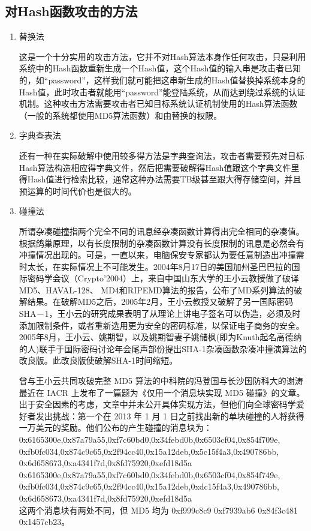 \subsection{对Hash函数攻击的方法}
\begin{enumerate}
\item 替换法

这是一个十分实用的攻击方法，它并不对Hash算法本身作任何攻击，只是利用系统中的Hash函数重新生成一个Hash值，这个Hash值的输入串是攻击者已知的，如“password”，这样我们就可能把这串新生成的Hash值替换掉系统本身的Hash值，此时攻击者就能用“password”能登陆系统，从而达到绕过系统的认证机制。这种攻击方法需要攻击者已知目标系统认证机制使用的Hash算法函数（一般的系统都使用MD5算法函数）和由替换的权限。
\item 字典查表法

还有一种在实际破解中使用较多得方法是字典查询法，攻击者需要预先对目标Hash算法构造相应得字典文件，然后把需要破解得Hash值跟这个字典文件里得Hash值进行检索比较，通常这种办法需要TB级甚至跟大得存储空间，并且预运算的时间代价也是很大的。
\item 碰撞法

所谓杂凑碰撞指两个完全不同的讯息经杂凑函数计算得出完全相同的杂凑值。根据鸽巢原理，以有长度限制的杂凑函数计算没有长度限制的讯息是必然会有冲撞情况出现的。可是，一直以来，电脑保安专家都认为要任意制造出冲撞需时太长，在实际情况上不可能发生。2004年8月17日的美国加州圣巴巴拉的国际密码学会议（Crypto’2004）上，来自中国山东大学的王小云教授做了破译MD5、HAVAL-128、 MD4和RIPEMD算法的报告，公布了MD系列算法的破解结果。在破解MD5之后，2005年2月，王小云教授又破解了另一国际密码SHA－1，王小云的研究成果表明了从理论上讲电子签名可以伪造，必须及时添加限制条件，或者重新选用更为安全的密码标准，以保证电子商务的安全。2005年8月，王小云、姚期智，以及姚期智妻子姚储枫(即为Knuth起名高德纳的人)联手于国际密码讨论年会尾声部份提出SHA-1杂凑函数杂凑冲撞演算法的改良版。此改良版使破解SHA-1时间缩短。

曾与王小云共同攻破完整 MD5 算法的中科院的冯登国与长沙国防科大的谢涛最近在 IACR 上发布了一篇题为《仅用一个消息块实现 MD5 碰撞》的文章。出于安全因素的考虑，文章中并未公开具体实现方法，但他们向全球密码学爱好者发出挑战：第一个在 2013 年 1 月 1 日之前找出新的单块碰撞的人将获得一万美元的奖励。他们公布的产生碰撞的消息块为：
0x6165300e,0x87a79a55,0xf7c60bd0,0x34febd0b,0x6503cf04,0x854f709e,\\
0xfb0fc034,0x874c9c65,0x2f94cc40,0x15a12deb,0x5c15f4a3,0x490786bb,\\
0x6d658673,0xa4341f7d,0x8fd75920,0xefd18d5a\\
0x6165300e,0x87a79a55,0xf7c60bd0,0x34febd0b,0x6503cf04,0x854f749e,\\
0xfb0fc034,0x874c9c65,0x2f94cc40,0x15a12deb,0xdc15f4a3,0x490786bb,\\
0x6d658673,0xa4341f7d,0x8fd75920,0xefd18d5a\\
这两个消息块有两处不同，但 MD5 均为 0xf999c8c9 0xf7939ab6 0x84f3c481 0x1457cb23。
\end{enumerate}

